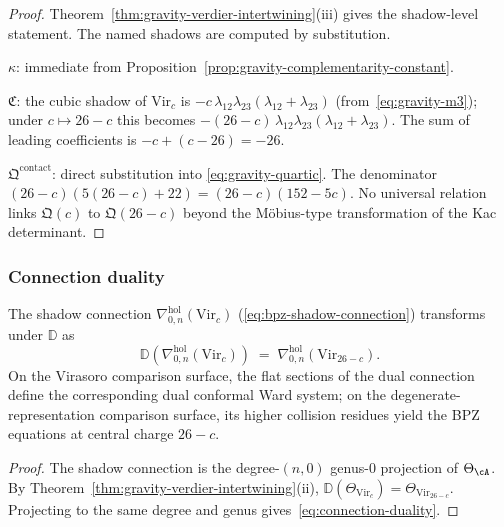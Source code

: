 \begin{proof}
Theorem~\ref{thm:gravity-verdier-intertwining}(iii) gives the
shadow-level statement. The named shadows are computed by
substitution.

$\kappa$: immediate from
Proposition~\ref{prop:gravity-complementarity-constant}.

$\mathfrak{C}$: the cubic shadow of $\mathrm{Vir}_c$ is
$-c\,\lambda_{12}\lambda_{23}(\lambda_{12}+\lambda_{23})$
(from~\eqref{eq:gravity-m3}); under $c \mapsto 26-c$ this
becomes $-(26-c)\,\lambda_{12}\lambda_{23}(\lambda_{12}+\lambda_{23})$.
The sum of leading coefficients is $-c + (c-26) = -26$.

$\mathfrak{Q}^{\mathrm{contact}}$: direct substitution into
\eqref{eq:gravity-quartic}. The denominator
$(26-c)(5(26-c)+22) = (26-c)(152 - 5c)$. No universal
relation links $\mathfrak{Q}(c)$ to $\mathfrak{Q}(26-c)$
beyond the M\"obius-type transformation of the Kac determinant.
\end{proof}

\subsubsection*{Connection duality}

\begin{proposition}
\label{prop:gravity-connection-duality}
The shadow connection
$\nabla^{\mathrm{hol}}_{0,n}(\mathrm{Vir}_c)$
\textup{(}\eqref{eq:bpz-shadow-connection}\textup{)}
transforms under $\mathbb{D}$ as
\begin{equation}\label{eq:connection-duality}
\mathbb{D}\!\left(
 \nabla^{\mathrm{hol}}_{0,n}(\mathrm{Vir}_c)
\right)
\;=\;
\nabla^{\mathrm{hol}}_{0,n}(\mathrm{Vir}_{26-c}).
\end{equation}
On the Virasoro comparison surface, the flat sections of the dual
connection define the corresponding dual conformal Ward system; on the
degenerate-representation comparison surface, its higher collision
residues yield the BPZ equations at central charge $26 - c$.
\end{proposition}

\begin{proof}
The shadow connection is the degree-$(n,0)$ genus-$0$ projection of
$\Theta_\cA$. By Theorem~\ref{thm:gravity-verdier-intertwining}(ii),
$\mathbb{D}(\Theta_{\mathrm{Vir}_c})
= \Theta_{\mathrm{Vir}_{26-c}}$. Projecting to the same degree
and genus gives~\eqref{eq:connection-duality}.
\end{proof}

